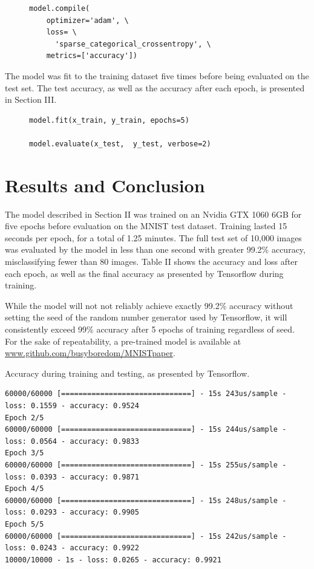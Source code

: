 \documentclass[transmag]{IEEEtran}
\begin{document}
\begin{figure}[H]
\begin{Verbatim}
model.compile(
    optimizer='adam', \
    loss= \
      'sparse_categorical_crossentropy', \
    metrics=['accuracy'])

\end{Verbatim}
\end{figure}

The model was fit to the training dataset five times before being evaluated on
the test set. The test accuracy, as well as the accuracy after each epoch,
is presented in Section III.

\begin{figure}[H]
\begin{Verbatim}
model.fit(x_train, y_train, epochs=5)

model.evaluate(x_test,  y_test, verbose=2)
\end{Verbatim}
\end{figure}

\section{Results and Conclusion}
 
The model described in Section II was trained on an Nvidia GTX 1060 6GB for 
five epochs before evaluation on the MNIST test dataset. Training lasted 15 
seconds per epoch, for a total of 1.25 minutes. The full test set of 10,000 
images was evaluated by the model in less than one second with greater 99.2\% 
accuracy, misclassifying fewer than 80 images. Table II shows the accuracy and 
loss after each epoch, as well as the final accuracy as presented by Tensorflow 
during training.
 
While the model will not not reliably achieve exactly 99.2\% accuracy without
setting the seed of the random number generator used by Tensorflow, it will
consistently exceed 99\% accuracy after 5 epochs of training regardless of
seed. For the sake of repeatability, a pre-trained model is available at 
\href{https://www.github.com/busyboredom/MNISTpaper}
{www.github.com/busyboredom/MNISTpaper}.

\begin{table}
  \caption{Accuracy during training and testing, as presented by Tensorflow.
  \label{table2}}
  \centering
  \begin{verbatim}
60000/60000 [==============================] - 15s 243us/sample - loss: 0.1559 - accuracy: 0.9524
Epoch 2/5
60000/60000 [==============================] - 15s 244us/sample - loss: 0.0564 - accuracy: 0.9833
Epoch 3/5
60000/60000 [==============================] - 15s 255us/sample - loss: 0.0393 - accuracy: 0.9871
Epoch 4/5
60000/60000 [==============================] - 15s 248us/sample - loss: 0.0293 - accuracy: 0.9905
Epoch 5/5
60000/60000 [==============================] - 15s 242us/sample - loss: 0.0243 - accuracy: 0.9922
10000/10000 - 1s - loss: 0.0265 - accuracy: 0.9921
  \end{verbatim}
\end{table}
\end{document}
